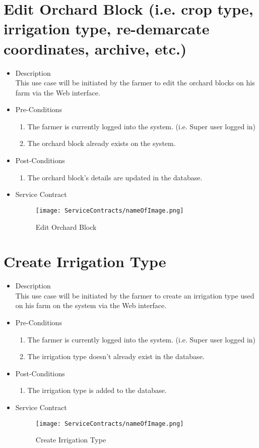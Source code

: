 \documentclass[11pt,fleqn]{book} %
\begin{document}
\section{Edit Orchard Block (i.e. crop type, irrigation type, re-demarcate coordinates, archive, etc.)}
\begin{itemize}
	\item Description\\
	This use case will be initiated by the farmer to edit the orchard blocks on his farm via the Web interface.
	\item Pre-Conditions
	\begin{enumerate}
		\item The farmer is currently logged into the system. (i.e. Super user logged in)
		\item The orchard block already exists on the system.				
	\end{enumerate}
	\item Post-Conditions
	\begin{enumerate}
		\item The orchard block’s details are updated in the database.
	\end{enumerate}
	\item Service Contract
	\begin{figure}
		\texttt{[image: ServiceContracts/nameOfImage.png]}
		\caption{Edit Orchard Block}
	\end{figure}
\end{itemize}

\section{Create Irrigation Type}
\begin{itemize}
	\item Description\\
	This use case will be initiated by the farmer to create an irrigation type used on his farm on the system via the Web interface.
	\item Pre-Conditions
	\begin{enumerate}
		\item The farmer is currently logged into the system. (i.e. Super user logged in)
		\item The irrigation type doesn’t already exist in the database. 
	\end{enumerate}
	\item Post-Conditions
	\begin{enumerate}
		\item The irrigation type is added to the database.	
	\end{enumerate}
	\item Service Contract
	\begin{figure}
		\texttt{[image: ServiceContracts/nameOfImage.png]}
		\caption{Create Irrigation Type}
	\end{figure}
\end{itemize}
\end{document}
